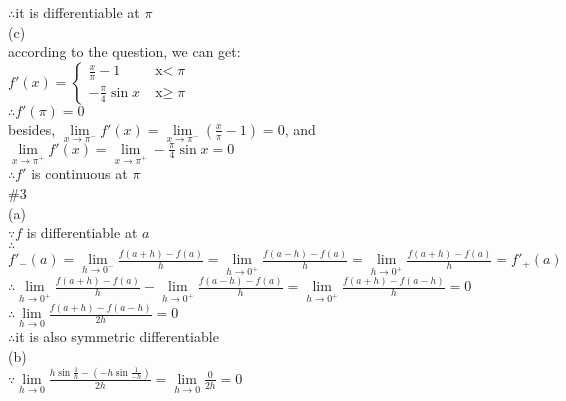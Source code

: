 \documentclass{article}
\begin{document}
$\therefore$\qquad it is differentiable at $\pi$\\

(c)\\

according to the question, we can get:\\

$f'(x)=\begin{cases}
\displaystyle\frac{x}{\pi}-1& \text{x$<$}\pi\\
\displaystyle-\frac{\pi}{4}\sin x& \text{x$\geq$}\pi
\end{cases}$\\

$ $\\

$\therefore$\qquad$f'(\pi)=0$\\

besides, $\lim \limits_{x \to \pi^-}f'(x)=\lim \limits_{x \to \pi^-}\left(\displaystyle\frac{x}{\pi}-1\right)=0$, and $\displaystyle\lim \limits_{x \to \pi^+}f'(x)=\lim \limits_{x \to \pi^+}-\frac{\pi}{4}\sin x=0$\\

$\therefore$\qquad $f'$ is continuous at $\pi$\\

\textcolor[rgb]{0.00,0.00,0.50}{\#3}\\

(a)\\

$\because$\qquad $f$ is differentiable at $a$\\

$\therefore$\qquad$\displaystyle f'_-(a)=\lim \limits_{h \to 0^-}\frac{f(a+h)-f(a)}{h}=\lim \limits_{h \to 0^+}\frac{f(a-h)-f(a)}{h}=\lim \limits_{h \to 0^+}\frac{f(a+h)-f(a)}{h}=f'_+(a)$\\

$\therefore$\qquad$\displaystyle\lim \limits_{h \to 0^+}\frac{f(a+h)-f(a)}{h}-\lim \limits_{h \to 0^+}\frac{f(a-h)-f(a)}{h}=\lim \limits_{h \to 0^+}\frac{f(a+h)-f(a-h)}{h}=0$\\

$\therefore$\qquad$\lim \limits_{h \to 0}\frac{f(a+h)-f(a-h)}{2h}=0$\\

$\therefore$\qquad it is also symmetric differentiable\\

(b)\\

$\because$\qquad$\displaystyle\lim \limits_{h \to 0}\frac{h\sin\frac{1}{h}-(-h\sin\frac{1}{-h})}{2h}=\lim \limits_{h \to 0}\frac{0}{2h}=0$\\
\end{document}
